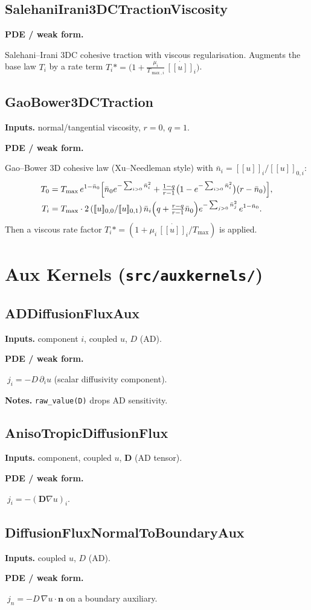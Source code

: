 \documentclass[11pt]{article}
\newcommand{\nvec}{\mathbf{n}}
\newenvironment{ecmEntry}[1]{%
  \subsection{#1}%
}{}
\newcommand{\inputsRow}[1]{\par\noindent\textbf{Inputs.} #1\par}
\newcommand{\pdeRow}[1]{\par\noindent\textbf{PDE / weak form.}\par #1\par}
\newcommand{\notesRow}[1]{\par\noindent\textbf{Notes.} #1\par}
\begin{document}
\begin{ecmEntry}{SalehaniIrani3DCTractionViscosity}
\pdeRow{Salehani--Irani 3DC cohesive traction with viscous regularisation. Augments the
base law $T_i$ by a rate term $T_i \mathrel{*\!=}\bigl(1 + \tfrac{\mu_i}{T_{\max,i}}\,\dot{[\![u]\!]_i}\bigr)$.}
\end{ecmEntry}

\begin{ecmEntry}{GaoBower3DCTraction}
\inputsRow{normal/tangential viscosity, $r=0,\,q=1$.}
\pdeRow{Gao--Bower 3D cohesive law (Xu--Needleman style) with
$\bar n_i = [\![u]\!]_i/[\![u]\!]_{0,i}$:
\[
\begin{aligned}
T_0 &= T_{\max}\,e^{1-\bar n_0}\Bigl[\bar n_0 e^{-\sum_{i>0}\bar n_i^2} +
       \tfrac{1-q}{r-1}\bigl(1 - e^{-\sum_{i>0}\bar n_i^2}\bigr)(r - \bar n_0)\Bigr],\\
T_i &= T_{\max}\cdot 2\,([\![u]\!]_{0,0}/[\![u]\!]_{0,1})\,\bar n_i\Bigl(q + \tfrac{r-q}{r-1}\bar n_0\Bigr)
       e^{-\sum_{j>0}\bar n_j^2}\,e^{1-\bar n_0}.
\end{aligned}
\]
Then a viscous rate factor $T_i\mathrel{*\!=}(1 + \mu_i\,\dot{[\![u]\!]_i}/T_{\max})$ is applied.}
\end{ecmEntry}

\section{Aux Kernels (\texttt{src/auxkernels/})}

\begin{ecmEntry}{ADDiffusionFluxAux}
\inputsRow{component $i$, coupled $u$, $D$ (AD).}
\pdeRow{$\;j_i = -D\,\partial_i u$ (scalar diffusivity component).}
\notesRow{\texttt{raw\_value(D)} drops AD sensitivity.}
\end{ecmEntry}

\begin{ecmEntry}{AnisoTropicDiffusionFlux}
\inputsRow{component, coupled $u$, $\bm{D}$ (AD tensor).}
\pdeRow{$\;j_i = -(\bm{D}\nabla u)_i$.}
\end{ecmEntry}

\begin{ecmEntry}{DiffusionFluxNormalToBoundaryAux}
\inputsRow{coupled $u$, $D$ (AD).}
\pdeRow{$\;j_n = -D\,\nabla u\!\cdot\!\nvec$ on a boundary auxiliary.}
\end{ecmEntry}
\end{document}
